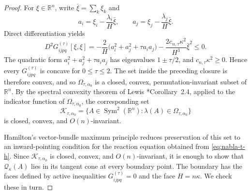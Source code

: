 \documentclass[11pt,reqno]{amsart}
\theoremstyle{definition}
\theoremstyle{remark}
\numberwithin{equation}{section}
\begin{document}
\begin{proof}
For $\xi\in\mathbb R^n$, write
$\bar\xi=\sum_k\xi_k$ and
\begin{equation*}
 a_i=\xi_i-\frac{\lambda_i}{H}\bar\xi,
 \qquad a_j=\xi_j-\frac{\lambda_j}{H}\bar\xi.
\end{equation*}
Direct differentiation yields
\begin{equation*}
 D^2G_{ijpq}^{(\tau)}[\xi,\xi]
 =-\frac2H\bigl(a_i^2+a_j^2+\tau a_i a_j\bigr)
   -\frac{2c_{n,\tau}\kappa^2}{H^3}\bar\xi^2\leq0.
\end{equation*}
The quadratic form $a_i^2+a_j^2+\tau a_i a_j$ has eigenvalues
$1\pm\tau/2$, and $c_{n,\tau}\kappa^2\geq0$.  Hence every
$G_{ijpq}^{(\tau)}$ is concave for
 $0\leq\tau\leq2$. The set inside the preceding closure is therefore convex, and so $\Omega_{\tau,\alpha_0}$ is a closed, convex,
 permutation-invariant subset of $\mathbb R^n$.  By the spectral convexity theorem of Lewis \cite{Lewis96}*{Corollary~2.4}, applied to the indicator function of $\Omega_{\tau,\alpha_0}$, the corresponding set
\begin{equation*}
 \mathcal K_{\tau,\alpha_0}
 =\{A\in\operatorname{Sym}^2(\mathbb R^n):
      \lambda(A)\in\Omega_{\tau,\alpha_0}\}
\end{equation*}
is closed, convex, and $O(n)$-invariant.

Hamilton's \cite{Ham86} vector-bundle maximum principle reduces preservation of this set to an inward-pointing condition for the reaction equation obtained from
\eqref{eq:nabla-t-h}.  Since
$\mathcal K_{\tau,\alpha_0}$ is closed, convex, and $O(n)$-invariant, it is
enough to show that $\mathcal Q_\kappa(A)$ lies in its tangent cone at every
boundary point.  The boundary has the faces defined by active inequalities
$G_{ijpq}^{(\tau)}=0$ and the face $H=n\kappa$.  We check these in turn.


\end{proof}
\end{document}

